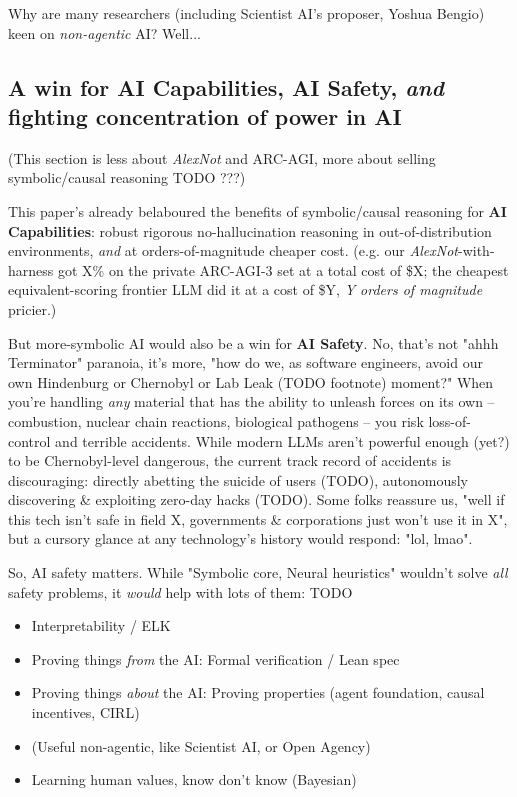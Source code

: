 \documentclass{article}
\begin{document}
Why are many researchers (including Scientist AI's proposer, Yoshua Bengio) keen on \textit{non-agentic} AI? Well...

\subsection{A win for AI Capabilities, AI Safety, \textit{and} fighting concentration of power in AI}

(This section is less about \textit{AlexNot} and ARC-AGI, more about selling symbolic/causal reasoning TODO ???)

This paper's already belaboured the benefits of symbolic/causal reasoning for \textbf{AI Capabilities}: robust rigorous no-hallucination reasoning in out-of-distribution environments, \textit{and} at orders-of-magnitude cheaper cost. (e.g. our \textit{AlexNot}-with-harness got X\% on the private ARC-AGI-3 set at a total cost of \$X; the cheapest equivalent-scoring frontier LLM did it at a cost of \$Y, \textit{Y orders of magnitude} pricier.)

But more-symbolic AI would also be a win for \textbf{AI Safety}. No, that's not "ahhh Terminator" paranoia, it's more, "how do we, as software engineers, avoid our own Hindenburg or Chernobyl or Lab Leak (TODO footnote) moment?" When you're handling \textit{any} material that has the ability to unleash forces on its own -- combustion, nuclear chain reactions, biological pathogens -- you risk loss-of-control and terrible accidents. While modern LLMs aren't powerful enough (yet?) to be Chernobyl-level dangerous, the current track record of accidents is discouraging: directly abetting the suicide of users (TODO), autonomously discovering \& exploiting zero-day hacks (TODO). Some folks reassure us, "well if this tech isn't safe in field X, governments \& corporations just won't use it in X", but a cursory glance at any technology's history would respond: "lol, lmao".

So, AI safety matters. While "Symbolic core, Neural heuristics" wouldn't solve \textit{all} safety problems, it \textit{would} help with lots of them: TODO

\begin{itemize}
    \item Interpretability / ELK
    \item Proving things \textit{from} the AI: Formal verification / Lean spec
    \item Proving things \textit{about} the AI: Proving properties (agent foundation, causal incentives, CIRL)
    \item (Useful non-agentic, like Scientist AI, or Open Agency)
    \item Learning human values, know don't know (Bayesian)
\end{itemize}
\end{document}
